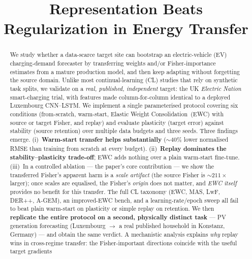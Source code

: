 \documentclass[conference]{IEEEtran}
\begin{document}
\title{Representation Beats Regularization in Energy Transfer}

\author{
}

\maketitle

\begin{abstract}
We study whether a data-scarce target site can bootstrap an electric-vehicle
(EV) charging-demand forecaster by transferring weights and/or Fisher-importance
estimates from a mature production model, and then keep adapting without
forgetting the source domain. Unlike most continual-learning (CL) studies that
rely on synthetic task splits, we validate on a \emph{real, published,
independent} target: the UK \emph{Electric Nation} smart-charging trial, with
features made column-for-column identical to a deployed Luxembourg CNN--LSTM.
We implement a single parameterised protocol covering six conditions
(from-scratch, warm-start, Elastic Weight Consolidation~(EWC) with source or
target Fisher, and replay) and evaluate plasticity (target error) against
stability (source retention) over multiple data budgets and three seeds.
Three findings emerge. (i)~\textbf{Warm-start transfer helps substantially}
(${\sim}40\%$ lower normalised RMSE than training from scratch at every budget).
(ii)~\textbf{Replay dominates the stability--plasticity trade-off}; EWC adds
nothing over a plain warm-start fine-tune. (iii)~In a controlled ablation --- the
paper's core contribution --- we show the transferred Fisher's apparent harm is a
\emph{scale artifact} (the source Fisher is ${\sim}211\times$ larger); once scales
are equalised, the Fisher's \emph{origin} does not matter, and \emph{EWC itself}
provides no benefit for this transfer. The full CL taxonomy
(EWC, MAS, LwF, DER++, A-GEM), an improved-EWC bench, and a learning-rate/epoch
sweep all fail to beat plain warm-start on plasticity or simple replay on
retention. We then \textbf{replicate the entire protocol on a second, physically
distinct task} --- PV generation forecasting (Luxembourg $\rightarrow$ a real
published household in Konstanz, Germany) --- and obtain the same verdict.
A mechanistic analysis explains \emph{why} replay wins in cross-regime transfer:
the Fisher-important directions coincide with the useful target gradients

\end{abstract}
\end{document}
